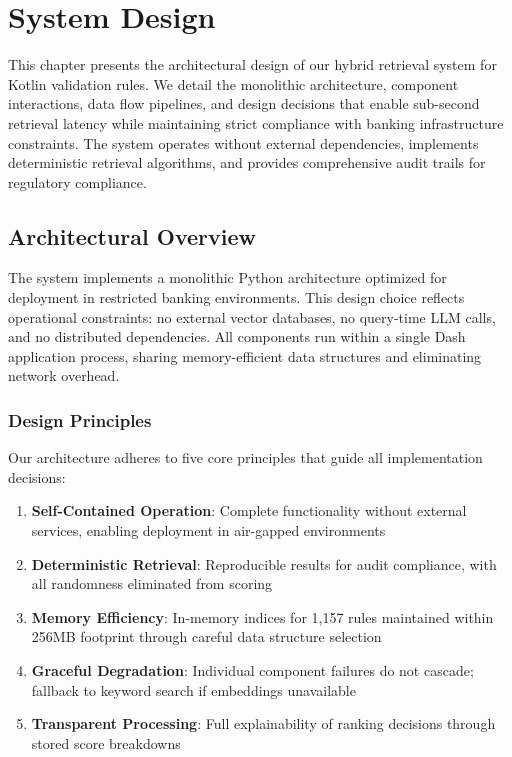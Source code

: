 \chapter{System Design}
\label{ch:system-design}

This chapter presents the architectural design of our hybrid retrieval system for Kotlin validation rules. We detail the monolithic architecture, component interactions, data flow pipelines, and design decisions that enable sub-second retrieval latency while maintaining strict compliance with banking infrastructure constraints. The system operates without external dependencies, implements deterministic retrieval algorithms, and provides comprehensive audit trails for regulatory compliance.

\section{Architectural Overview}

The system implements a monolithic Python architecture optimized for deployment in restricted banking environments. This design choice reflects operational constraints: no external vector databases, no query-time LLM calls, and no distributed dependencies. All components run within a single Dash application process, sharing memory-efficient data structures and eliminating network overhead.

\subsection{Design Principles}

Our architecture adheres to five core principles that guide all implementation decisions:

\begin{enumerate}[leftmargin=*,itemsep=2pt,topsep=2pt]
  \item \textbf{Self-Contained Operation}: Complete functionality without external services, enabling deployment in air-gapped environments
  \item \textbf{Deterministic Retrieval}: Reproducible results for audit compliance, with all randomness eliminated from scoring
  \item \textbf{Memory Efficiency}: In-memory indices for 1,157 rules maintained within 256MB footprint through careful data structure selection
  \item \textbf{Graceful Degradation}: Individual component failures do not cascade; fallback to keyword search if embeddings unavailable
  \item \textbf{Transparent Processing}: Full explainability of ranking decisions through stored score breakdowns
\end{enumerate}

